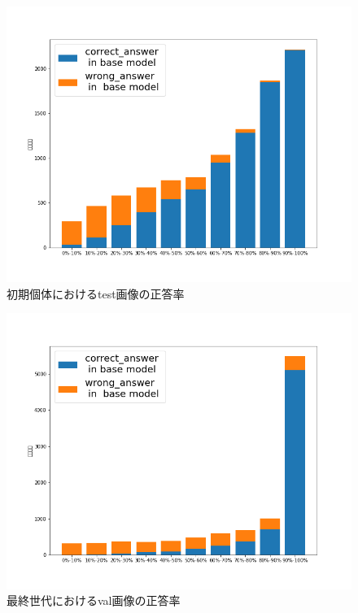 \documentclass[twocolumn]{jarticle}     %
\begin{document}
\begin{figure}[h]
	\centering
	\includegraphics[scale=0.3]{graph_test_init.png}
	\caption{初期個体におけるtest画像の正答率\label{fig:accInitTest}}
\end{figure}

\begin{figure}[h]
	\centering
	\includegraphics[scale=0.3]{graph_val_before.png}
	\caption{最終世代におけるval画像の正答率\label{fig:accLastVal}}
\end{figure}
\end{document}
